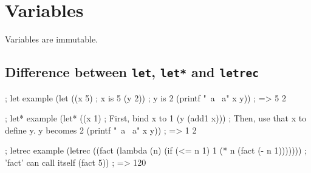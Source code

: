 \section{Variables}

Variables are immutable.

\subsection{Difference between \texttt{let}, \texttt{let*} and \texttt{letrec}}

\begin{racketcode}
; let example
(let ((x 5)      ; x is 5
      (y 2))     ; y is 2
  (printf "~a ~a\n" x y)) ; => 5 2

; let* example
(let* ((x 1)           ; First, bind x to 1
       (y (add1 x)))   ; Then, use that x to define y. y becomes 2
  (printf "~a ~a\n" x y)) ; => 1 2

; letrec example
(letrec ((fact (lambda (n)
                 (if (<= n 1)
                     1
                     (* n (fact (- n 1))))))) ; 'fact' can call itself
  (fact 5)) ; => 120
\end{racketcode}

